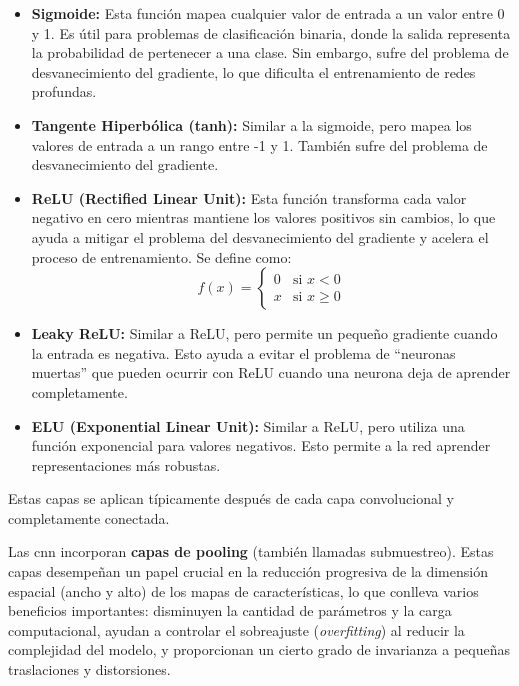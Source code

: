 \documentclass[11pt,spanish,listoffigures,listoftables]{tfgetsinf}
\begin{document}
\begin{itemize}
   \item \textbf{Sigmoide:} Esta función mapea cualquier valor de entrada a un valor entre 0 y 1. Es útil para problemas de clasificación binaria, donde la salida representa la probabilidad de pertenecer a una clase. Sin embargo, sufre del problema de desvanecimiento del gradiente, lo que dificulta el entrenamiento de redes profundas.
   \item \textbf{Tangente Hiperbólica (tanh):} Similar a la sigmoide, pero mapea los valores de entrada a un rango entre -1 y 1. También sufre del problema de desvanecimiento del gradiente.
   \item \textbf{ReLU (Rectified Linear Unit):} Esta función transforma cada valor negativo en cero mientras mantiene los valores positivos sin cambios, lo que ayuda a mitigar el problema del desvanecimiento del gradiente y acelera el proceso de entrenamiento. Se define como:
   \begin{equation}
   f(x) = \begin{cases}
      0 & \text{si } x < 0 \\
      x & \text{si } x \geq 0
   \end{cases}
   \end{equation}
   \item \textbf{Leaky ReLU:} Similar a ReLU, pero permite un pequeño gradiente cuando la entrada es negativa. Esto ayuda a evitar el problema de ``neuronas muertas'' que pueden ocurrir con ReLU cuando una neurona deja de aprender completamente.
   \item \textbf{ELU (Exponential Linear Unit):} Similar a ReLU, pero utiliza una función exponencial para valores negativos. Esto permite a la red aprender representaciones más robustas.
\end{itemize}

Estas capas se aplican típicamente después de cada capa convolucional y completamente conectada.

Las \gls{cnn} incorporan \textbf{capas de pooling} (también llamadas submuestreo). Estas capas desempeñan un papel crucial en la reducción progresiva de la dimensión espacial (ancho y alto) de los mapas de características, lo que conlleva varios beneficios importantes: disminuyen la cantidad de parámetros y la carga computacional, ayudan a controlar el sobreajuste (\textit{overfitting}) al reducir la complejidad del modelo, y proporcionan un cierto grado de invarianza a pequeñas traslaciones y distorsiones. 
\end{document}
